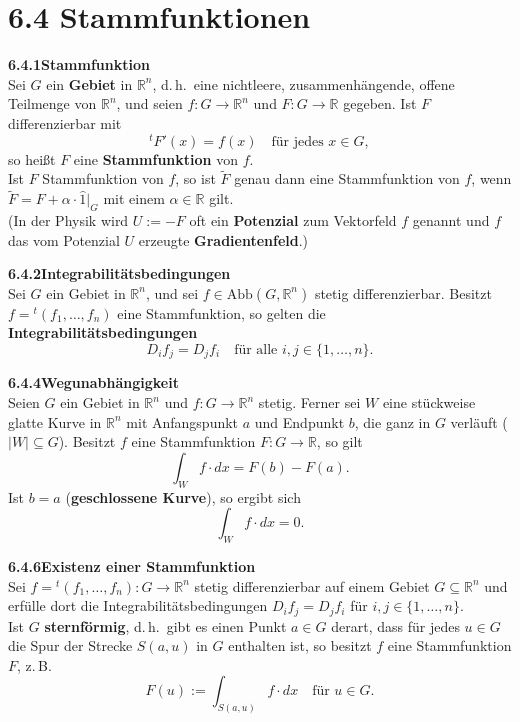 \documentclass[a4paper,12pt]{article}
\newcommand{\gentry}[3]{%
  \noindent\textbf{#1\quad #2}\nopagebreak\\[0.2em]
  #3\par\smallskip
}
\begin{document}
\section*{6.4 \quad Stammfunktionen}

\gentry{6.4.1}{Stammfunktion}{%
  Sei $G$ ein \textbf{Gebiet} in $\mathbb{R}^n$, d.\,h.\ eine nichtleere, zusammenhängende,
  offene Teilmenge von $\mathbb{R}^n$, und seien $f : G \longrightarrow \mathbb{R}^n$ und
  $F : G \longrightarrow \mathbb{R}$ gegeben. Ist $F$ differenzierbar mit
  \[
    {}^t F'(x) = f(x) \quad \text{für jedes } x \in G,
  \]
  so heißt $F$ eine \textbf{Stammfunktion} von $f$.\\
  Ist $F$ Stammfunktion von $f$, so ist $\widetilde{F}$ genau dann eine Stammfunktion von $f$,
  wenn $\widetilde{F} = F + \alpha \cdot \widehat{1}|_G$ mit einem $\alpha \in \mathbb{R}$ gilt.\\
  (In der Physik wird $U := -F$ oft ein \textbf{Potenzial} zum Vektorfeld $f$ genannt und
  $f$ das vom Potenzial $U$ erzeugte \textbf{Gradientenfeld}.)
}

\gentry{6.4.2}{Integrabilitätsbedingungen}{%
  Sei $G$ ein Gebiet in $\mathbb{R}^n$, und sei $f \in \mathrm{Abb}(G, \mathbb{R}^n)$ stetig
  differenzierbar. Besitzt $f = {}^t(f_1, \ldots, f_n)$ eine Stammfunktion, so gelten die
  \textbf{Integrabilitätsbedingungen}
  \[
    D_i f_j = D_j f_i \quad \text{für alle } i, j \in \{1, \ldots, n\}.
  \]
}

\gentry{6.4.4}{Wegunabhängigkeit}{%
  Seien $G$ ein Gebiet in $\mathbb{R}^n$ und $f : G \longrightarrow \mathbb{R}^n$ stetig.
  Ferner sei $W$ eine stückweise glatte Kurve in $\mathbb{R}^n$ mit Anfangspunkt $a$ und
  Endpunkt $b$, die ganz in $G$ verläuft ($|W| \subseteq G$). Besitzt $f$ eine Stammfunktion
  $F : G \longrightarrow \mathbb{R}$, so gilt
  \[
    \int_W f \cdot dx = F(b) - F(a).
  \]
  Ist $b = a$ (\textbf{geschlossene Kurve}), so ergibt sich
  \[
    \int_W f \cdot dx = 0.
  \]
}

\gentry{6.4.6}{Existenz einer Stammfunktion}{%
  Sei $f = {}^t(f_1, \ldots, f_n) : G \longrightarrow \mathbb{R}^n$ stetig differenzierbar
  auf einem Gebiet $G \subseteq \mathbb{R}^n$ und erfülle dort die Integrabilitätsbedingungen
  $D_i f_j = D_j f_i$ für $i, j \in \{1, \ldots, n\}$.\\
  Ist $G$ \textbf{sternförmig}, d.\,h.\ gibt es einen Punkt $a \in G$ derart, dass für jedes
  $u \in G$ die Spur der Strecke $S(a, u)$ in $G$ enthalten ist, so besitzt $f$ eine
  Stammfunktion $F$, z.\,B.
  \[
    F(u) := \int_{S(a,u)} f \cdot dx \quad \text{für } u \in G.
  \]
}
\end{document}

